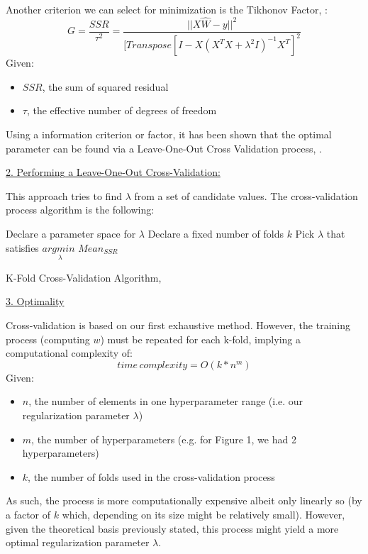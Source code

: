 \documentclass{homework}
\begin{document}
Another criterion we can select for minimization is the Tikhonov Factor, \cite{wikipedia_2021}:
$$G=\frac{SSR}{\tau^2}=\frac{||X\hat{W}-y||^2}{[{Transpose}[I-X(X^TX+\lambda^2I)^{-1}X^T]^2}$$
Given:
\begin{itemize}
    \item $SSR$, the sum of squared residual
    \item $\tau$, the effective number of degrees of freedom
\end{itemize}

Using a information criterion or factor, it has been shown that the optimal parameter can be found via a 
Leave-One-Out Cross Validation process, \cite{ridge}.

\underline{2. Performing a Leave-One-Out Cross-Validation:}

This approach tries to find $\lambda$ from a set of candidate values. The cross-validation process algorithm is the following:

\begin{algorithm}[H]
\SetAlgoLined
 Declare a parameter space for $\lambda$\;
 Declare a fixed number of folds $k$\;
 Pick $\lambda$ that satisfies $\underset{\lambda}{argmin\,\,}{{Mean}_{SSR}}$\;
 \caption{K-Fold Cross-Validation Algorithm, \cite{micha}}
\end{algorithm}

\underline{3. Optimality}

Cross-validation is based on our first exhaustive method. However, the training process (computing $w$) must 
be repeated for each k-fold, implying a computational complexity of:
$${time}\,{complexity}=O(k*n^m)$$
Given:
\begin{itemize}
    \item $n$, the number of elements in one hyperparameter range (i.e. our regularization parameter 
    $\lambda$)
    \item $m$, the number of hyperparameters (e.g. for Figure 1, we had 2 hyperparameters)
    \item $k$, the number of folds used in the cross-validation process
\end{itemize}
As such, the process is more computationally expensive albeit only linearly so (by a factor of $k$ which, 
depending on its size might be relatively small). However, given the theoretical basis previously stated, 
this process might yield a more optimal regularization parameter $\lambda$. 
\end{document}
